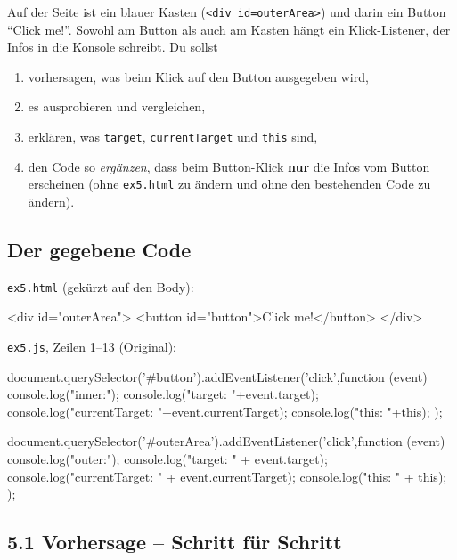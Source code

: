 \documentclass[a4paper,11pt]{article}
\begin{document}
Auf der Seite ist ein blauer Kasten (\texttt{<div id=\textquotedbl{}outerArea\textquotedbl{}>}) und darin ein Button "`Click me!"'. Sowohl am
Button als auch am Kasten hängt ein Klick-Listener, der Infos in die Konsole schreibt. Du sollst
\begin{enumerate}[nosep]
\item vorhersagen, was beim Klick auf den Button ausgegeben wird,
\item es ausprobieren und vergleichen,
\item erklären, was \texttt{target}, \texttt{currentTarget} und \texttt{this} sind,
\item den Code so \emph{ergänzen}, dass beim Button-Klick \textbf{nur} die Infos vom Button erscheinen
      (ohne \texttt{ex5.html} zu ändern und ohne den bestehenden Code zu ändern).
\end{enumerate}

\subsection{Der gegebene Code}

\texttt{ex5.html} (gekürzt auf den Body):
\begin{htmlcode}[numbers=none]
<div id="outerArea">
    <button id="button">Click me!</button>
</div>
\end{htmlcode}

\texttt{ex5.js}, Zeilen 1--13 (Original):
\begin{code}
document.querySelector('#button').addEventListener('click',function (event){
    console.log("inner:");
    console.log("target: "+event.target);
    console.log("currentTarget: "+event.currentTarget);
    console.log("this: "+this);
});

document.querySelector('#outerArea').addEventListener('click',function (event){
        console.log("outer:");
        console.log("target: " + event.target);
        console.log("currentTarget: " + event.currentTarget);
        console.log("this: " + this);
});
\end{code}

\subsection{5.1 Vorhersage -- Schritt für Schritt}
\end{document}
